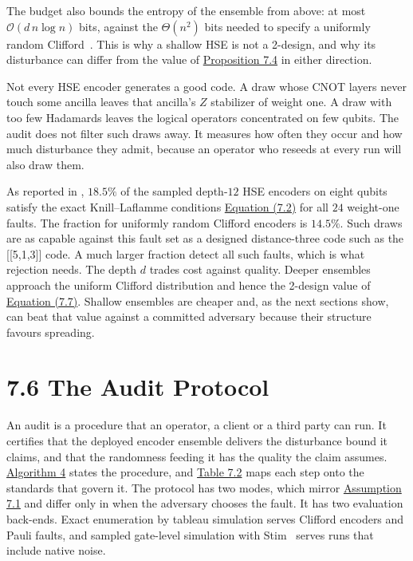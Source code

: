 \documentclass{report}
\theoremstyle{plain}
\theoremstyle{definition}
\theoremstyle{remark}
\newcommand{\bigO}[1]{\mathcal{O}\!\left(#1\right)}
\begin{document}
The budget also bounds the entropy of the ensemble from above: at most $\bigO{d\,n\log n}$ bits, against the $\Theta(n^{2})$ bits needed to specify a uniformly random Clifford~\cite{koenig2014clifford}. This is why a shallow HSE is not a 2-design, and why its disturbance can differ from the value of \hyperref[prop:qec:haar]{Proposition 7.4} in either direction.

Not every HSE encoder generates a good code. A draw whose CNOT layers never touch some ancilla leaves that ancilla's $Z$ stabilizer of weight one. A draw with too few Hadamards leaves the logical operators concentrated on few qubits. The audit does not filter such draws away. It measures how often they occur and how much disturbance they admit, because an operator who reseeds at every run will also draw them.

As reported in \cite{guo2026qecaudit}, $18.5\%$ of the sampled depth-$12$ HSE encoders on eight qubits satisfy the exact Knill--Laflamme conditions \hyperref[eq:qec:kl]{Equation (7.2)} for all $24$ weight-one faults. The fraction for uniformly random Clifford encoders is $14.5\%$. Such draws are as capable against this fault set as a designed distance-three code such as the [[5,1,3]] code. A much larger fraction detect all such faults, which is what rejection needs. The depth $d$ trades cost against quality. Deeper ensembles approach the uniform Clifford distribution and hence the 2-design value of \hyperref[eq:qec:haar]{Equation (7.7)}. Shallow ensembles are cheaper and, as the next sections show, can beat that value against a committed adversary because their structure favours spreading.

\section{7.6 The Audit Protocol}\label{sec:qec:protocol}

An audit is a procedure that an operator, a client or a third party can run. It certifies that the deployed encoder ensemble delivers the disturbance bound it claims, and that the randomness feeding it has the quality the claim assumes. \hyperref[alg:qec:audit]{Algorithm 4} states the procedure, and \hyperref[tab:qec:protocol]{Table 7.2} maps each step onto the standards that govern it. The protocol has two modes, which mirror \hyperref[ass:qec:model]{Assumption 7.1} and differ only in when the adversary chooses the fault. It has two evaluation back-ends. Exact enumeration by tableau simulation serves Clifford encoders and Pauli faults, and sampled gate-level simulation with Stim~\cite{gidney2021stim} serves runs that include native noise.
\end{document}
